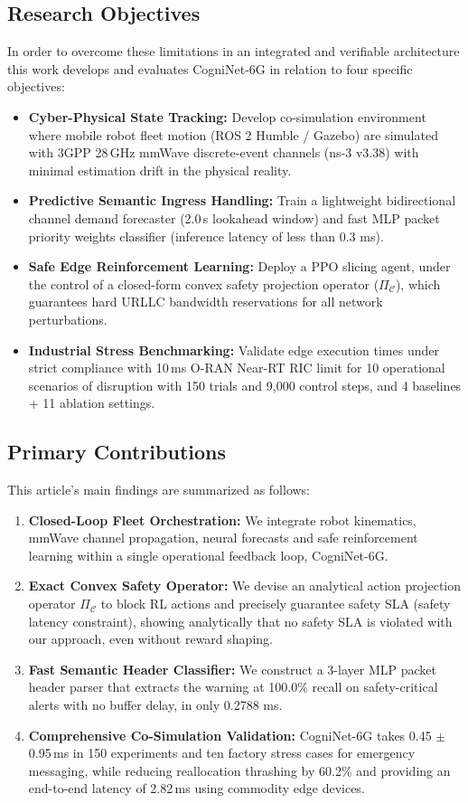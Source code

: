 \documentclass[twocolumn,10pt,twoside]{article}
\begin{document}
\subsection{Research Objectives}
In order to overcome these limitations in an integrated and verifiable architecture this work develops and evaluates CogniNet-6G in relation to four specific objectives:
\begin{itemize}
    \item \textbf{Cyber-Physical State Tracking:} Develop co-simulation environment where mobile robot fleet motion (ROS 2 Humble / Gazebo) are simulated with 3GPP 28\,GHz mmWave discrete-event channels (ns-3 v3.38) with minimal estimation drift in the physical reality.
    \item \textbf{Predictive Semantic Ingress Handling:} Train a lightweight bidirectional channel demand forecaster (2.0\,s lookahead window) and fast MLP packet priority weights classifier (inference latency of less than 0.3 ms).
    \item \textbf{Safe Edge Reinforcement Learning:} Deploy a PPO slicing agent, under the control of a closed-form convex safety projection operator ($\Pi_{\mathcal{C}}$), which guarantees hard URLLC bandwidth reservations for all network perturbations.
    \item \textbf{Industrial Stress Benchmarking:} Validate edge execution times under strict compliance with 10\,ms O-RAN Near-RT RIC limit for 10 operational scenarios of disruption with 150 trials and 9,000 control steps, and 4 baselines + 11 ablation settings.
\end{itemize}

\subsection{Primary Contributions}
This article's main findings are summarized as follows:
\begin{enumerate}
    \item \textbf{Closed-Loop Fleet Orchestration:} We integrate robot kinematics, mmWave channel propagation, neural forecasts and safe reinforcement learning within a single operational feedback loop, CogniNet-6G.
    \item \textbf{Exact Convex Safety Operator:} We devise an analytical action projection operator $\Pi_{\mathcal{C}}$ to block RL actions and precisely guarantee safety SLA (safety latency constraint), showing analytically that no safety SLA is violated with our approach, even without reward shaping.
    \item \textbf{Fast Semantic Header Classifier:} We construct a 3-layer MLP packet header parser that extracts the warning at 100.0\% recall on safety-critical alerts with no buffer delay, in only 0.2788 ms.
    \item \textbf{Comprehensive Co-Simulation Validation:} CogniNet-6G takes 0.45 $\pm$ 0.95\,ms in 150 experiments and ten factory stress cases for emergency messaging, while reducing reallocation thrashing by 60.2\% and providing an end-to-end latency of 2.82\,ms using commodity edge devices.
\end{enumerate}
\end{document}
